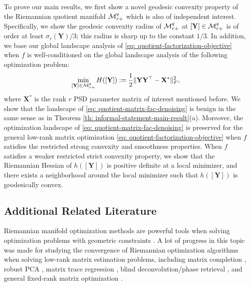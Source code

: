 \documentclass[11pt]{article}
\newcommand{\0}{{\mathbf{0}}}
\newcommand{\1}{{\mathbf{1}}}
\newcommand{\X}{{\mathbf{X}}}
\newcommand{\Y}{{\mathbf{Y}}}
\newcommand{\cM}{{\cal M}}
\newcommand{\F}{{\rm F}}
\begin{document}
To prove our main results, we first show a novel geodesic convexity property of the Riemannian quotient manifold $\cM_{r+}^q$ which is also of independent interest. Specifically, we show the geodesic convexity radius of $\cM_{r+}^q$ at $[\Y] \in \cM_{r+}^q$ is of order at least $\sigma_r(\Y)/3$; this radius is sharp up to the constant $1/3$. In addition, we base our global landscape analysis of \eqref{eq: quotient-factorization-objective} when $f$ is well-conditioned on the global landscape analysis of the following optimization problem:
\begin{equation} \label{eq: quotient-matrix-fac-denoising}
	\min_{[\Y] \in \cM_{r+}^q } H ([\Y]) := \frac{1}{2} \| \Y \Y^\top - \X^* \|_\F^2,
\end{equation} where $\X^*$ is the rank $r$ PSD parameter matrix of interest mentioned before. We show that the landscape of \eqref{eq: quotient-matrix-fac-denoising} is benign in the same sense as in Theorem \ref{th: informal-statement-main-result}(a). Moreover, the optimization landscape of \eqref{eq: quotient-matrix-fac-denoising} is preserved for the general low-rank matrix optimization \eqref{eq: quotient-factorization-objective} when $f$ satisfies the restricted strong convexity and smoothness properties. When $f$ satisfies a weaker restricted strict convexity property, we show that the Riemannian Hessian of $h([\Y])$ is positive definite at a local minimizer, and there exists a neighborhood around the local minimizer such that $h([\Y])$ is geodesically convex. 

\subsection{Additional Related Literature} \label{sec: related-literature}
 Riemannian manifold optimization methods are powerful tools when solving optimization problems with geometric constraints \cite{absil2009optimization,boumal2020introduction}. A lot of progress in this topic was made for studying the convergence of Riemannian optimization algorithms when solving low-rank matrix estimation problems, including matrix completion \cite{keshavan2009matrix,boumal2011rtrmc,vandereycken2013low,dong2022analysis}, robust PCA \cite{zhang2018robust}, matrix trace regression \cite{wei2016guarantees,meyer2011linear,luo2020recursive}, blind deconvolution/phase retrieval \cite{huang2018blind,luo2020recursive}, and general fixed-rank matrix optimization \cite{mishra2014fixed}. 
\end{document}
